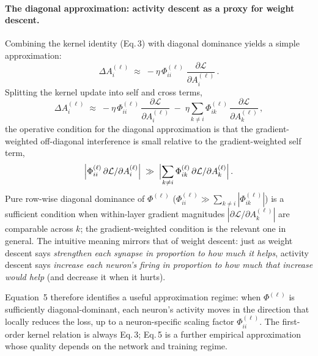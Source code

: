 \documentclass[10pt]{article}
\newcommand{\loss}{\mathcal{L}}
\begin{document}
\paragraph{The diagonal approximation: activity descent as a proxy for weight descent.}
Combining the kernel identity (Eq.\,3) with diagonal dominance yields a simple approximation:
%
\begin{equation}\label{eq:diag}
  \Delta A_i^{(\ell)} \;\approx\; -\eta\,\Phi^{(\ell)}_{ii}\;\frac{\partial \loss}{\partial A_i^{(\ell)}}\,.
\end{equation}
%
Splitting the kernel update into self and cross terms,
\[
  \Delta A_i^{(\ell)}
  \;\approx\; -\eta\,\Phi^{(\ell)}_{ii}\,\frac{\partial\loss}{\partial A_i^{(\ell)}}
  \;-\;\eta\sum_{k\neq i}\Phi^{(\ell)}_{ik}\,\frac{\partial\loss}{\partial A_k^{(\ell)}}\,,
\]
the operative condition for the diagonal approximation is that the gradient-weighted off-diagonal interference is small relative to the gradient-weighted self term,
\[
  \Bigl|\Phi^{(\ell)}_{ii}\,\partial\loss/\partial A_i^{(\ell)}\Bigr|
  \;\gg\;
  \Bigl|\sum_{k\neq i}\Phi^{(\ell)}_{ik}\,\partial\loss/\partial A_k^{(\ell)}\Bigr|\,.
\]
Pure row-wise diagonal dominance of $\Phi^{(\ell)}$ ($\Phi^{(\ell)}_{ii}\gg\sum_{k\neq i}|\Phi^{(\ell)}_{ik}|$) is a sufficient condition when within-layer gradient magnitudes $|\partial\loss/\partial A_k^{(\ell)}|$ are comparable across $k$; the gradient-weighted condition is the relevant one in general.  The intuitive meaning mirrors that of weight descent: just as weight descent says \emph{strengthen each synapse in proportion to how much it helps}, activity descent says \emph{increase each neuron's firing in proportion to how much that increase would help} (and decrease it when it hurts).

Equation~5 therefore identifies a useful approximation regime: when $\Phi^{(\ell)}$ is sufficiently diagonal-dominant, each neuron's activity moves in the direction that locally reduces the loss, up to a neuron-specific scaling factor $\Phi^{(\ell)}_{ii}$.  The first-order kernel relation is always Eq.\,3; Eq.\,5 is a further empirical approximation whose quality depends on the network and training regime.
\end{document}
